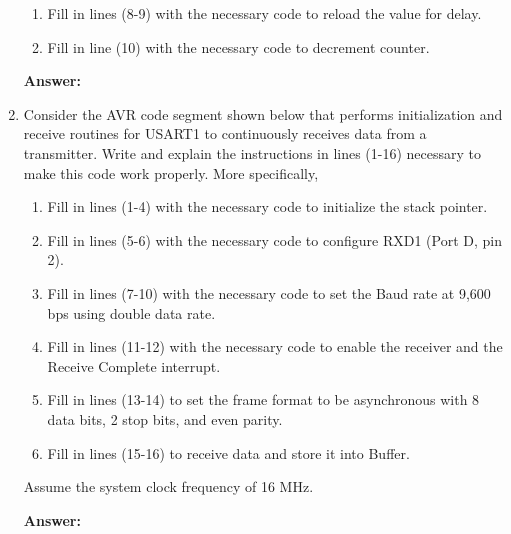 \documentclass[12pt,letterpaper]{article}
\begin{document}
\begin{enumerate}
\begin{enumerate}[a]
			\item
			Fill in lines (8-9) with the necessary code to reload the value for delay.
			
			\item
			Fill in line (10) with the necessary code to decrement counter.
		\end{enumerate}
		
		\textbf{Answer:}
		
		
		\clearpage
		
		\item
		Consider the AVR code segment shown below that performs initialization and receive routines for USART1 to continuously receives data from a transmitter. Write and explain the instructions in lines (1-16) necessary to make this code work properly. 
		More specifically,
		\begin{enumerate}[a]
			\item 
			Fill in lines (1-4) with the necessary code to initialize the stack pointer.
			
			\item 
			Fill in lines (5-6) with the necessary code to configure RXD1 (Port D, pin 2).
			
			\item 
			Fill in lines (7-10) with the necessary code to set the Baud rate at 9,600 bps using double data rate.
			
			\item 
			Fill in lines (11-12) with the necessary code to enable the receiver and the Receive Complete interrupt.
			
			\item 
			Fill in lines (13-14) to set the frame format to be asynchronous with 8 data bits, 2 stop bits, and even parity.
			
			\item 
			Fill in lines (15-16) to receive data and store it into Buffer.
		\end{enumerate}
		Assume the system clock frequency of 16 MHz.
		
		\textbf{Answer:}
		
		
	\end{enumerate}
\end{document}
